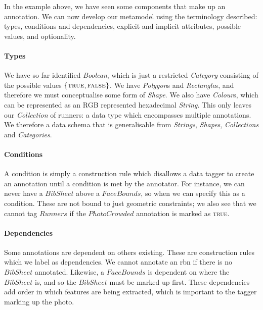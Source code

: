
In the example above, we have seen some components that make up an annotation. We can now develop our metamodel using the terminology described: types, conditions and dependencies, explicit and implicit attributes, possible values, and
    optionality.

\paragraph{Types} We have so far identified \textit{Boolean}, which is just a restricted \textit{Category} consisting of the possible values $\{ \textsc{true}, \textsc{false} \}$. We have \textit{Polygon}s and \textit{Rectangle}s, and therefore we must conceptualise some form of \textit{Shape}. We also have \textit{Colour}s, which can be represented as an RGB represented hexadecimal \textit{String}. This only leaves our \textit{Collection} of runners: a data type which encompasses multiple annotations. We therefore a data schema that is  generalisable from \textit{Strings}, \textit{Shapes}, \textit{Collections} and \textit{Categories}.

\paragraph{Conditions} A condition is simply a construction rule which disallows a data tagger to create an annotation until a condition is met by the annotator. For instance, we can never have a $BibSheet$ above a $FaceBounds$, so when we can specify this as a condition. These are not bound to just geometric constraints; we also see that we cannot tag $Runners$ if the $PhotoCrowded$ annotation is marked as \textsc{true}.

\paragraph{Dependencies} Some annotations are dependent on others existing. These are construction rules which we label as dependencies. We cannot annotate an \gls{rbn} if there is no $BibSheet$ annotated. Likewise, a $FaceBounds$ is dependent on where the $BibSheet$ is, and so the $BibSheet$ must be marked up first. These dependencies add order in which features are being extracted, which is important to the tagger marking up the photo.

